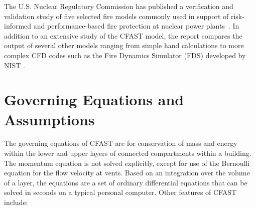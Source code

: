 \documentclass[12pt]{book}
\begin{document}
The U.S. Nuclear Regulatory Commission has published a verification and validation study of five selected fire models commonly used in support of risk-informed and performance-based fire protection at nuclear power plants~\cite{NRCNUREG1824}. In addition to an extensive study of the CFAST model, the report compares the output of several other models ranging from simple hand calculations to more complex CFD codes such as the Fire Dynamics Simulator (FDS) developed by NIST \cite{FDS_Tech_Guide_6}.


\section{Governing Equations and Assumptions}

The governing equations of CFAST are for conservation of mass and energy within the lower and upper layers of connected compartments within a building. The momentum equation is not solved explicitly, except for use of the Bernoulli equation for the flow velocity at vents. Based on an integration over the volume of a layer, the equations are a set of ordinary differential equations that can be solved in seconds on a typical personal computer. Other features of CFAST include:
\end{document}
